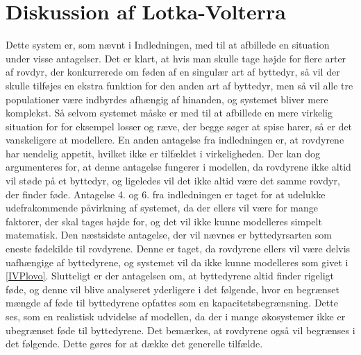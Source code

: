\section{Diskussion af Lotka-Volterra}
Dette system er, som nævnt i Indledningen, med til at afbillede en situation under visse antagelser. Det er klart, at hvis man skulle tage højde for flere arter af rovdyr, der konkurrerede om føden af en singulær art af byttedyr, så vil der skulle tilføjes en ekstra funktion for den anden art af byttedyr, men så vil alle tre populationer være indbyrdes afhængig af hinanden, og systemet bliver mere komplekst. Så selvom systemet måske er med til at afbillede en mere virkelig situation for for eksempel losser og ræve, der begge søger at spise harer, så er det vanskeligere at modellere. En anden antagelse fra indledningen er, at rovdyrene har uendelig appetit, hvilket ikke er tilfældet i virkeligheden. Der kan dog argumenteres for, at denne antagelse fungerer i modellen, da rovdyrene ikke altid vil støde på et byttedyr, og ligeledes vil det ikke altid være det samme rovdyr, der finder føde. Antagelse 4. og 6. fra indledningen er taget for at udelukke udefrakommende påvirkning af systemet, da der ellers vil være for mange faktorer, der skal tages højde for, og det vil ikke kunne modelleres simpelt matematisk. Den næstsidste antagelse, der vil nævnes er byttedyrsarten som eneste fødekilde til rovdyrene. Denne er taget, da rovdyrene ellers vil være delvis uafhængige af byttedyrene, og systemet vil da ikke kunne modelleres som givet i \eqref{IVPlovo}. Slutteligt er der antagelsen om, at byttedyrene altid finder rigeligt føde, og denne vil blive analyseret yderligere i det følgende, hvor en begrænset mængde af føde til byttedyrene opfattes som en kapacitetsbegrænsning. Dette ses, som en realistisk udvidelse af modellen, da der i mange økosystemer ikke er ubegrænset føde til byttedyrene. Det bemærkes, at rovdyrene også vil begrænses i det følgende. Dette gøres for at dække det generelle tilfælde.